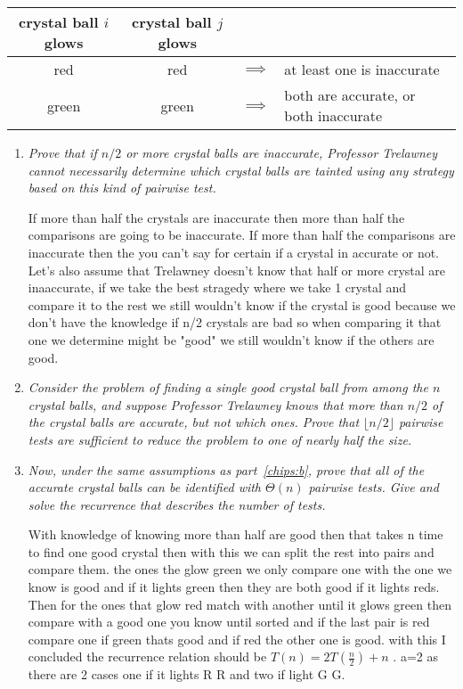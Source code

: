 \documentclass[12pt]{article}
\begin{document}
\begin{enumerate}
	\begin{small}
    	\begin{center}
        	\begin{tabular}{ccll}
        	crystal ball $i$ glows & crystal ball $j$ glows & &  \\
        	\hline
        	red & red & $\implies$ & at least one is inaccurate \\
        	green & green & $\implies$ & both are accurate, or both inaccurate \\
        	\end{tabular}
    	\end{center}
	\end{small}

	\begin{enumerate}
    	\item\textit{ Prove that if $n/2$ or more crystal balls are inaccurate, Professor Trelawney cannot necessarily determine which crystal balls are tainted using any strategy based on this kind of pairwise test.}

If more than half the crystals are inaccurate then more than half the comparisons are going to be inaccurate. If more than half the comparisons are inaccurate then the you can't say for certain if a crystal in accurate or not. Let's also assume that Trelawney doesn't know that half or more crystal are inaaccurate, if we take the best stragedy where we take 1 crystal and compare it to the rest we still wouldn't know if the crystal is good because we don't have the knowledge if n/2 crystals are bad so when comparing it that one we determine might be "good" we still wouldn't know if the others are good. 

    	\item\textit{ \label{chips:b} Consider the problem of finding a single good crystal ball from among the $n$ crystal balls, and suppose Professor Trelawney knows that more than $n/2$ of the crystal balls are accurate, but not which ones. Prove that $\lfloor n/2\rfloor$ pairwise tests are sufficient to reduce the problem to one of nearly half the size.}

    	\item\textit{ Now, under the same assumptions as part~\eqref{chips:b}, prove that all of the accurate crystal balls can be identified with $\Theta(n)$ pairwise tests. Give and solve the recurrence that describes the number of tests.}

	With knowledge of knowing more than half are good then that takes n time to find one good crystal then with this we can split the rest into pairs and compare them. the ones the glow green we only compare one with the one we know is good and if it lights green then they are both good if it lights reds. Then for the ones that glow red match with another until it glows green then compare with a good one you know until sorted and if the last pair is red compare one if green thats good and if red the other one is good. with this I concluded the recurrence relation should be $T(n) = 2T(\frac{n}{2}) + n$ . a=2 as there are 2 cases one if it lights R R and two if light G G.
	\end{enumerate}


\end{enumerate}
\end{document}
